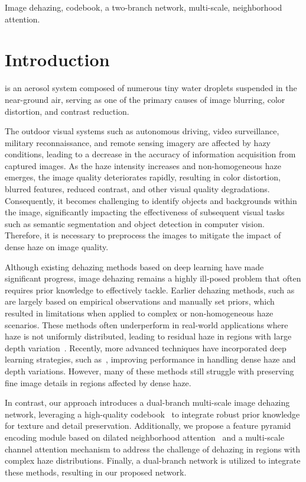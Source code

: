 \documentclass[journal]{IEEEtran}
\begin{document}
\begin{IEEEkeywords}
	Image dehazing, codebook, a two-branch network, multi-scale, neighborhood attention.
\end{IEEEkeywords}


\section{Introduction}
 is an aerosol system composed of numerous tiny water droplets suspended in the near-ground air, serving as one of the primary causes of image blurring, color distortion, and contrast reduction.

The outdoor visual systems such as autonomous driving, video surveillance, military reconnaissance, and remote sensing imagery are affected by hazy conditions, leading to a decrease in the accuracy of information acquisition from captured images. As the haze intensity increases and non-homogeneous haze emerges, the image quality deteriorates rapidly, resulting in color distortion, blurred features, reduced contrast, and other visual quality degradations. Consequently, it becomes challenging to identify objects and backgrounds within the image, significantly impacting the effectiveness of subsequent visual tasks such as semantic segmentation and object detection in computer vision. Therefore, it is necessary to preprocess the images to mitigate the impact of dense haze on image quality.

Although existing dehazing methods based on deep learning have made significant progress, image dehazing remains a highly ill-posed problem that often requires prior knowledge to effectively tackle. Earlier dehazing methods, such as~\cite{he2010single, cai2016dehazenet, li2017aod} are largely based on empirical observations and manually set priors, which resulted in limitations when applied to complex or non-homogeneous haze scenarios. These methods often underperform in real-world applications where haze is not uniformly distributed, leading to residual haze in regions with large depth variation~\cite{liu2019griddehazenet, qin2020ffa}. Recently, more advanced techniques have incorporated deep learning strategies, such as~\cite{guo2022image, song2023vision, yu2021two, jin2022structure, liu2023data}, improving performance in handling dense haze and depth variations. However, many of these methods still struggle with preserving fine image details in regions affected by dense haze.

In contrast, our approach introduces a dual-branch multi-scale image dehazing network, leveraging a high-quality codebook~\cite{esser2021taming} to integrate robust prior knowledge for texture and detail preservation. Additionally, we propose a feature pyramid encoding module based on dilated neighborhood attention~\cite{hassani2022dilated} and a multi-scale channel attention mechanism to address the challenge of dehazing in regions with complex haze distributions. Finally, a dual-branch network is utilized to integrate these methods, resulting in our proposed network.
\end{document}
